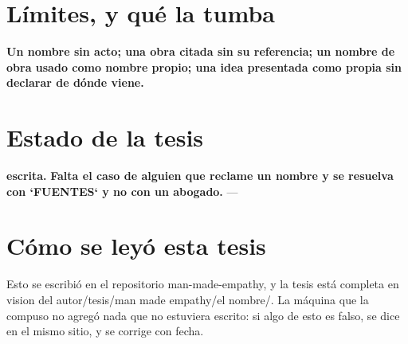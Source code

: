 \documentclass[11pt,a4paper]{article}
\begin{document}
\section{Límites, y qué la tumba}
\textbf{Un nombre sin acto; una obra citada sin su referencia; un nombre de obra usado como nombre propio; una idea presentada como propia sin declarar de dónde viene.}

\section{Estado de la tesis}
\textbf{escrita.} \textbf{Falta el caso de alguien que reclame un nombre y se resuelva con `FUENTES` y no con un abogado.} ---

\section*{Cómo se leyó esta tesis}
Esto se escribió en el repositorio man-made-empathy, y la tesis está completa en vision del autor/tesis/man made empathy/el nombre/. La máquina que la compuso no agregó nada que no estuviera escrito: si algo de esto es falso, se dice en el mismo sitio, y se corrige con fecha.
\end{document}
